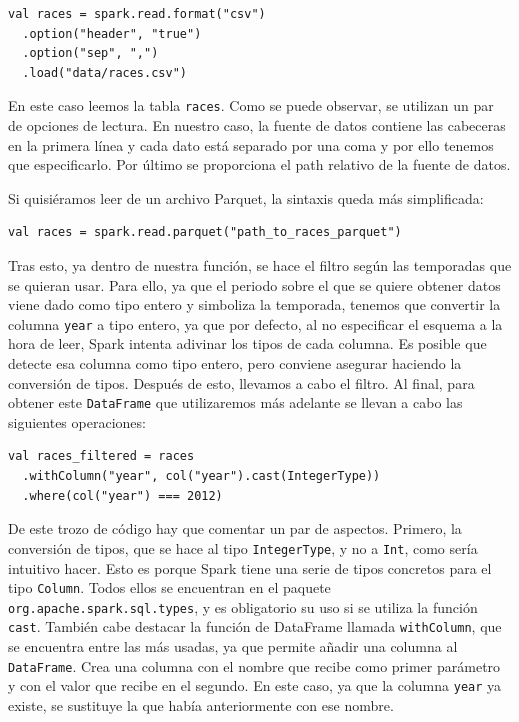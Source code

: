\documentclass[12pt,twoside,titlepage]{report}
\begin{document}
\begin{lstlisting}
val races = spark.read.format("csv")
  .option("header", "true")
  .option("sep", ",")
  .load("data/races.csv")
\end{lstlisting}

En este caso leemos la tabla \texttt{races}. Como se puede observar, se utilizan un par de opciones de lectura. En nuestro caso, la fuente de datos contiene las cabeceras en la primera línea y cada dato está separado por una coma y por ello tenemos que especificarlo. Por último se proporciona el path relativo de la fuente de datos.

Si quisiéramos leer de un archivo Parquet, la sintaxis queda más simplificada:

\begin{lstlisting}
val races = spark.read.parquet("path_to_races_parquet")
\end{lstlisting}

Tras esto, ya dentro de nuestra función, se hace el filtro según las temporadas que se quieran usar. Para ello, ya que el periodo sobre el que se quiere obtener datos viene dado como tipo entero y simboliza la temporada, tenemos que convertir la columna \texttt{year} a tipo entero, ya que por defecto, al no especificar el esquema a la hora de leer, Spark intenta adivinar los tipos de cada columna. Es posible que detecte esa columna como tipo entero, pero conviene asegurar haciendo la conversión de tipos. Después de esto, llevamos a cabo el filtro. Al final, para obtener este \texttt{DataFrame} que utilizaremos más adelante se llevan a cabo las siguientes operaciones:

\begin{lstlisting}
val races_filtered = races
  .withColumn("year", col("year").cast(IntegerType))
  .where(col("year") === 2012)
\end{lstlisting}

De este trozo de código hay que comentar un par de aspectos. Primero, la conversión de tipos, que se hace al tipo \texttt{IntegerType}, y no a \texttt{Int}, como sería intuitivo hacer. Esto es porque Spark tiene una serie de tipos concretos para el tipo \texttt{Column}. Todos ellos se encuentran en el paquete \texttt{org.apache.spark.sql.types}, y es obligatorio su uso si se utiliza la función \texttt{cast}. También cabe destacar la función de DataFrame llamada \texttt{withColumn}, que se encuentra entre las más usadas, ya que permite añadir una columna al \texttt{DataFrame}. Crea una columna con el nombre que recibe como primer parámetro y con el valor que recibe en el segundo. En este caso, ya que la columna \texttt{year} ya existe, se sustituye la que había anteriormente con ese nombre.
\end{document}

